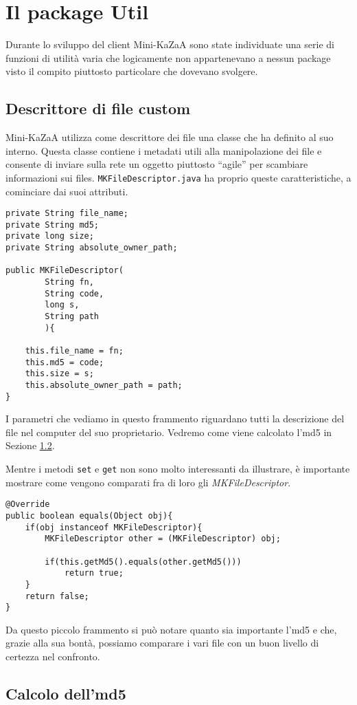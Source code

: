 \chapter{Il package Util}
Durante lo sviluppo del client Mini-KaZaA sono state individuate una serie di funzioni di utilità varia che logicamente non appartenevano a nessun package visto il compito piuttosto particolare che dovevano svolgere.

\section{Descrittore di file custom}\label{sec:mk_filedescriptor}
Mini-KaZaA utilizza come descrittore dei file una classe che ha definito al suo interno.
Questa classe contiene i metadati utili alla manipolazione dei file e consente di inviare sulla rete un oggetto piuttosto ``agile'' per scambiare informazioni sui files.
\verb|MKFileDescriptor.java| ha proprio queste caratteristiche, a cominciare dai suoi attributi.
\begin{lstlisting}
private String file_name;
private String md5;
private long size;
private String absolute_owner_path;

public MKFileDescriptor(
		String fn,
		String code,
		long s,
		String path
		){
		
	this.file_name = fn;
	this.md5 = code;
	this.size = s;
	this.absolute_owner_path = path;
}
\end{lstlisting}
I parametri che vediamo in questo frammento riguardano tutti la descrizione del file nel computer del suo proprietario. Vedremo come viene calcolato l'md5 in Sezione \ref{sec:md5}.

Mentre i metodi \verb|set| e \verb|get| non sono molto interessanti da illustrare, è importante mostrare come vengono comparati fra di loro gli \emph{MKFileDescriptor}.
\begin{lstlisting}
@Override
public boolean equals(Object obj){
	if(obj instanceof MKFileDescriptor){
		MKFileDescriptor other = (MKFileDescriptor) obj;

		if(this.getMd5().equals(other.getMd5()))
			return true;
	}
	return false;
}

\end{lstlisting}
Da questo piccolo frammento si può notare quanto sia importante l'md5 e che, grazie alla sua bontà, possiamo comparare i vari file con un buon livello di certezza nel confronto.

\section{Calcolo dell'md5}\label{sec:md5}


